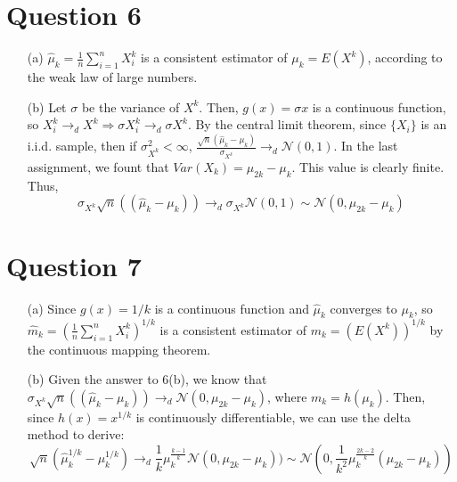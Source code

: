 \documentclass{article}
\newcommand{\N}{\mathcal{N}}
\begin{document}

\section*{Question 6}
\begin{itemize}
	\item[(a)] $\hat{\mu}_k = \frac{1}{n}\sum_{i=1}^nX_i^k$ is a consistent estimator of $\mu_k=E(X^k)$, according to the weak law of large numbers.
	\item[(b)] Let $\sigma$ be the variance of $X^k$. Then, $g(x)=\sigma x$ is a continuous function, so ${X_i^k\rightarrow_dX^k\Rightarrow\sigma X_i^k\rightarrow_d\sigma X^k}$. By the central limit theorem, since $\{X_i\}$ is an i.i.d. sample, then if $\sigma^2_{X^k}<\infty$, ${\frac{\sqrt{n}(\hat{\mu}_k-\mu_k)}{\sigma_{X^k}}\rightarrow_d\N(0,1)}$. In the last assignment, we fount that ${Var(X_k)=\mu_{2k}-\mu_k}$. This value is clearly finite. Thus,
		\[
			\sigma_{X^k}\sqrt{n}((\hat{\mu}_k-\mu_k))\rightarrow_d\sigma_{X^k}\N(0,1)\sim\N(0,\mu_{2k}-\mu_k)
		\]
\end{itemize}



\section*{Question 7}
\begin{itemize}
	\item[(a)] Since $g(x)=1/k$ is a continuous function and $\hat{\mu}_k$ converges to $\mu_k$, so $\hat{m}_k = \left(\frac{1}{n}\sum_{i=1}^nX_i^k\right)^{1/k}$ is a consistent estimator of $m_k=\left(E(X^k)\right)^{1/k}$ by the continuous mapping theorem.
	\item[(b)] Given the answer to 6(b), we know that ${\sigma_{X^k}\sqrt{n}((\hat{\mu}_k-\mu_k))\rightarrow_d\N(0,\mu_{2k}-\mu_k)}$, where $m_k=h(\mu_k)$. Then, since $h(x)=x^{1/k}$ is continuously differentiable, we can use the delta method to derive:
		\[
			\sqrt{n}\left(\hat{\mu}_k^{1/k}-\mu_k^{1/k}\right)\rightarrow_d\frac{1}{k}\mu_k^{\frac{k-1}{k}}\N(0,\mu_{2k}-\mu_k))\sim\N\left(0,\frac{1}{k^2}\mu_k^{\frac{2k-2}{k}}(\mu_{2k}-\mu_k)\right)
		\]
\end{itemize}


\end{document}
